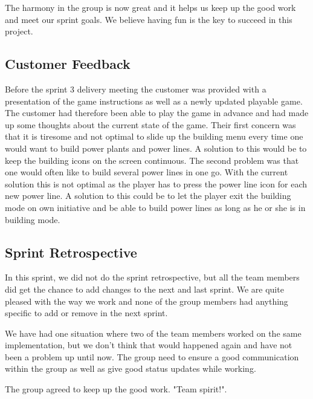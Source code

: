 	The harmony in the group is now great and it helps us keep up the good work and meet 
	our sprint goals. We believe having fun is the key to succeed in this project. 

\subsection{Customer Feedback}

	Before the sprint 3 delivery meeting the customer was provided with a presentation 
	of the game instructions as well as a newly updated playable game. The customer had 
	therefore been able to play the game in advance and had made up some thoughts about 
	the current state of the game. Their first concern was that it is tiresome and not 
	optimal to slide up the building menu every time one would want to build power plants 
	and power lines. A solution to this would be to keep the building icons on the screen 
	continuous. The second problem was that one would often like to build several power 
	lines in one go. With the current solution this is not optimal as the player has to 
	press the power line icon for each new power line. A solution to this could be to let 
	the player exit the building mode on own initiative and be able to build power lines as 
	long as he or she is in building mode.

\subsection{Sprint Retrospective}
	In this sprint, we did not do the sprint retrospective, but all the team members did
	get the chance to add changes to the next and last sprint. We are quite pleased with the way 
	we work and none of the group members had anything specific to add or remove in the next sprint.

	We have had one situation where two of the team members worked on the same implementation, 
	but we don't think that would happened again and have not been a problem up until now. 
	The group need to ensure a good communication within the group as well as give good status
	updates while working. 

	The group agreed to keep up the good work. "Team spirit!".
